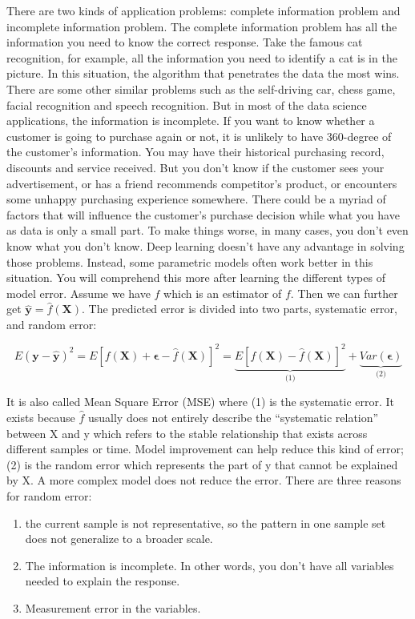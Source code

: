 \documentclass[12pt,]{krantz}
\providecommand{\tightlist}{%
  \setlength{\itemsep}{0pt}\setlength{\parskip}{0pt}}
\theoremstyle{definition}
\theoremstyle{definition}
\theoremstyle{remark}
\begin{document}
There are two kinds of application problems: complete information
problem and incomplete information problem. The complete information
problem has all the information you need to know the correct response.
Take the famous cat recognition, for example, all the information you
need to identify a cat is in the picture. In this situation, the
algorithm that penetrates the data the most wins. There are some other
similar problems such as the self-driving car, chess game, facial
recognition and speech recognition. But in most of the data science
applications, the information is incomplete. If you want to know whether
a customer is going to purchase again or not, it is unlikely to have
360-degree of the customer's information. You may have their historical
purchasing record, discounts and service received. But you don't know if
the customer sees your advertisement, or has a friend recommends
competitor's product, or encounters some unhappy purchasing experience
somewhere. There could be a myriad of factors that will influence the
customer's purchase decision while what you have as data is only a small
part. To make things worse, in many cases, you don't even know what you
don't know. Deep learning doesn't have any advantage in solving those
problems. Instead, some parametric models often work better in this
situation. You will comprehend this more after learning the different
types of model error. Assume we have \(\hat{f}\) which is an estimator
of \(f\). Then we can further get
\(\mathbf{\hat{y}}=\hat{f}(\mathbf{X})\). The predicted error is divided
into two parts, systematic error, and random error:

\[E(\mathbf{y}-\hat{\mathbf{y}})^{2}=E[f(\mathbf{X})+\mathbf{\epsilon}-\hat{f}(\mathbf{X})]^{2}=\underset{\text{(1)}}{\underbrace{E[f(\mathbf{X})-\hat{f}(\mathbf{X})]^{2}}}+\underset{\text{(2)}}{\underbrace{Var(\mathbf{\epsilon})}}
\label{eq:error}\]

It is also called Mean Square Error (MSE) where (1) is the systematic
error. It exists because \(\hat{f}\) usually does not entirely describe
the ``systematic relation'' between X and y which refers to the stable
relationship that exists across different samples or time. Model
improvement can help reduce this kind of error; (2) is the random error
which represents the part of y that cannot be explained by X. A more
complex model does not reduce the error. There are three reasons for
random error:

\begin{enumerate}
\def\labelenumi{\arabic{enumi}.}
\tightlist
\item
  the current sample is not representative, so the pattern in one sample
  set does not generalize to a broader scale.
\item
  The information is incomplete. In other words, you don't have all
  variables needed to explain the response.
\item
  Measurement error in the variables.
\end{enumerate}
\end{document}
